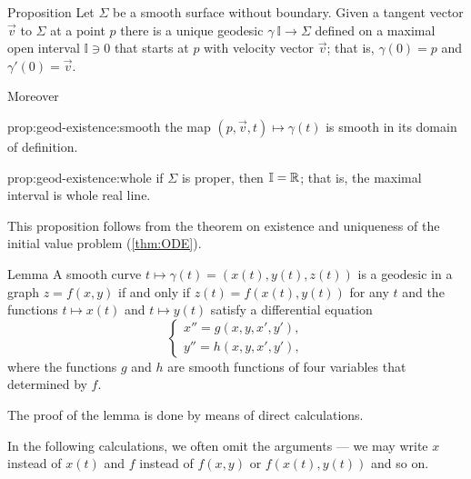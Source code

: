 \begin{thm}{Proposition}\label{prop:geod-existence} 
Let $\Sigma$ be  a smooth surface without boundary.
Given a tangent vector ${\vec v}$ to $\Sigma$ at a point $p$
there is a unique geodesic $\gamma\:\mathbb{I}\to \Sigma$ defined on a maximal open interval $\mathbb{I}\ni 0$ that starts at $p$ with velocity vector ${\vec v}$;
that is, $\gamma(0)=p$ and $\gamma'(0)={\vec v}$.

Moreover
\begin{subthm}{prop:geod-existence:smooth} the map $(p,{\vec v},t)\mapsto \gamma(t)$ is smooth in its domain of definition.
\end{subthm}

\begin{subthm}{prop:geod-existence:whole} if $\Sigma$ is proper, then $\mathbb{I}=\mathbb{R}$; that is, the maximal interval is whole real line.
\end{subthm}

\end{thm}

This proposition follows from the theorem on existence and uniqueness of the initial value problem (\ref{thm:ODE}).

\begin{thm}{Lemma}\label{lem:geodesic=2nd-order}
A smooth curve $t\mapsto \gamma(t)=(x(t),y(t),z(t))$ is a geodesic in a graph $z=f(x,y)$ if and only if $z(t)=f(x(t),y(t))$ for any $t$ and the functions $t\mapsto x(t)$ and $t\mapsto y(t)$
satisfy a differential equation
\[
\begin{cases}
x''=g(x,y,x',y'),
\\
y''=h(x,y,x',y'),
\end{cases}
\]
where the functions $g$ and $h$ are smooth functions of four variables that determined by $f$.
\end{thm}

The proof of the lemma is done by means of direct calculations.

 In the following calculations, we often omit the arguments --- we may write $x$ instead of $x(t)$  and $f$ instead of $f(x,y)$ or $f(x(t),y(t))$ and so on.

